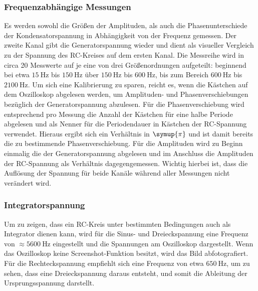 \subsubsection{Frequenzabhängige Messungen}
\label{sec:durch_freq}
Es werden sowohl die Größen der Amplituden, als auch die Phasenunterschiede der Kondensatorspannung in Abhängigkeit von der Frequenz gemessen.
Der zweite Kanal gibt die Generatorspannung wieder und dient als visueller Vergleich zu der Spannung des RC-Kreises auf dem ersten Kanal.
Die Messreihe wird in circa 20 Messwerte auf je eine von drei Größenordnungen aufgeteilt: beginnend bei etwa $\SI{15}{\hertz}$ bis $\SI{150}{\hertz}$ über $\SI{150}{\hertz}$ bis $\SI{600}{\hertz}$, bis zum Bereich
$\SI{600}{\hertz}$ bis $\SI{2100}{\hertz}$.
Um sich eine Kalibrierung zu sparen, reicht es, wenn die Kästchen auf dem Oszilloskop abgelesen werden, um Amplituden- und Phasenverschiebungen
bezüglich der Generatorspannung abzulesen. Für die Phasenverschiebung wird entsprechend pro Messung die Anzahl der Kästchen für eine halbe Periode
abgelesen und als Nenner für die Periodendauer in Kästchen der RC-Spannung verwendet. Hieraus ergibt sich ein Verhältnis in $\symup{\pi}$ und ist damit bereits die zu bestimmende Phasenverschiebung.
Für die Amplituden wird zu Beginn einmalig die der Generatorspannung abgelesen und im Anschluss die Amplituden der RC-Spannung
als Verhältnis dagegengemessen. Wichtig hierbei ist, dass die Auflösung der Spannung für beide Kanäle während aller Messungen
nicht verändert wird.

\subsubsection{Integratorspannung}
Um zu zeigen, dass ein RC-Kreis unter bestimmten Bedingungen auch als Integrator dienen kann, wird für die Sinus- und Dreieckspannung
eine Frequenz von $\approx \SI{5600}{\hertz}$ eingestellt und die Spannungen am Oszilloskop dargestellt. Wenn das Oszilloskop keine Screenshot-Funktion besitzt,
wird das Bild abfotografiert.
Für die Rechteckspannung empfiehlt sich eine Frequenz von etwa $\SI{650}{\hertz}$, um zu sehen, dass eine Dreieckspannung daraus entsteht, und somit die Ableitung
der Ursprungsspannung darstellt.